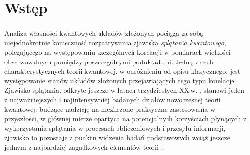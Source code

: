 \chapter*{Wstęp}
\label{chp:intro}

\paragraph{}
\label{par:intro:01}
Analiza własności kwantowych układów złożonych pociąga za sobą niejednokrotnie
konieczność rozpatrywania zjawiska
 \emph{splątania kwantowego},
polegającego na występowaniu szczególnych korelacji w pomiarach
wielkości obserwowalnych pomiędzy poszczególnymi podukładami.
Jedną z cech charakterystycznych teorii kwantowej,
w odróżnieniu od opisu klasycznego,
jest występowanie stanów układów złożonych przejawiających tego typu korelacje.
Zjawisko splątania, odkryte jeszcze w latach trzydziestych XX\,w.
\cite{einstein1935can,schrodinger1935gegenwartige},
stanowi jeden z najważniejszych i najintensywniej badanych działów nowoczesnej
teorii kwantowej:
budzące nadzieję na niezliczone praktyczne zastosowania w przyszłości,
w głównej mierze opartych na potencjalnych korzyściach płynących
z wykorzystania splątania w procesach obliczeniowych i przesyłu informacji,
zjawisko to pozostaje z punktu widzenia badań podstawowych wciąż jeszcze jednym
z najbardziej zagadkowych elementów
\mbox{teorii \cite{horodecki2009quantum}}.

